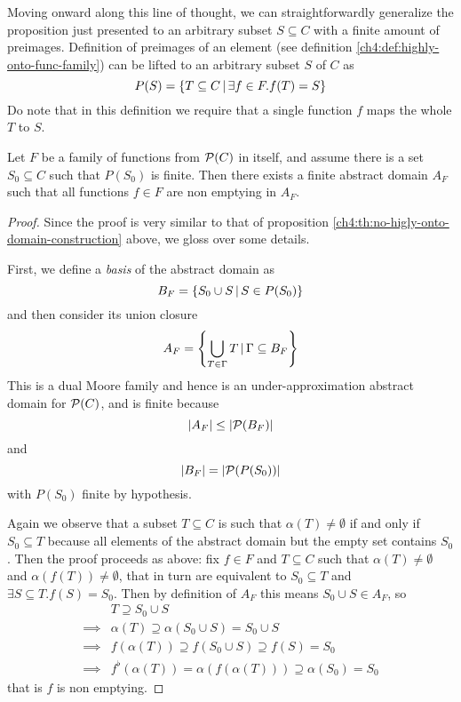 Moving onward along this line of thought, we can straightforwardly generalize the proposition just presented to an arbitrary subset $S \subseteq C$ with a finite amount of preimages.
Definition of preimages of an element (see definition \ref{ch4:def:highly-onto-func-family}) can be lifted to an arbitrary subset $S$ of $C$ as
\[
P(S) = \{ T \subseteq C \,\vert\, \exists f \in F. f(T) = S \}
\]
Do note that in this definition we require that a single function $f$ maps the whole $T$ to $S$.
\begin{prop}\label{ch4:th:existence-finte-backward}
	Let $F$ be a family of functions from $\mathcal{P}(C)$ in itself, and assume there is a set $S_0 \subseteq C$ such that $P(S_0)$ is finite. Then there exists a finite abstract domain $A_F$ such that all functions $f \in F$ are non emptying in $A_F$.
\end{prop}
\begin{proof}
	Since the proof is very similar to that of proposition \ref{ch4:th:no-higly-onto-domain-construction} above, we gloss over some details.

	First, we define a \textit{basis} of the abstract domain as
	\[
	B_F = \{ S_0 \cup S \,\vert\, S \in P(S_0) \}
	\]
	and then consider its union closure
	\[
	A_F = \left\lbrace \bigcup\limits_{T \in \Gamma} T \,\vert\, \Gamma \subseteq B_F \right\rbrace
	\]
	This is a dual Moore family and hence is an under-approximation abstract domain for $\mathcal{P}(C)$, and is finite because
	\[
	\lvert A_F\rvert \le \lvert\mathcal{P}(B_F)\rvert
	\]
	and
	\[
	\lvert B_F\rvert = \lvert\mathcal{P}(P(S_0))\rvert
	\]
	with $P(S_0)$ finite by hypothesis.

	Again we observe that a subset $T \subseteq C$ is such that $\alpha(T) \neq \emptyset$ if and only if $S_0 \subseteq T$ because all elements of the abstract domain but the empty set contains $S_0$. Then the proof proceeds as above: fix $f \in F$ and $T \subseteq C$ such that $\alpha(T) \neq \emptyset$ and $\alpha(f(T)) \neq \emptyset$, that in turn are equivalent to $S_0 \subseteq T$ and $\exists S \subseteq T. f(S) = S_0$. Then by definition of $A_F$ this means $S_0 \cup S \in A_F$, so
	\begin{align*}
		&T \supseteq S_0 \cup S \\
		\implies& \alpha(T) \supseteq \alpha(S_0 \cup S) = S_0 \cup S \\
		\implies& f(\alpha(T)) \supseteq f(S_0 \cup S) \supseteq f(S) = S_0 \\
		\implies& f^{\flat}(\alpha(T)) = \alpha(f(\alpha(T))) \supseteq \alpha(S_0) = S_0
	\end{align*}
	that is $f$ is non emptying.
\end{proof}

